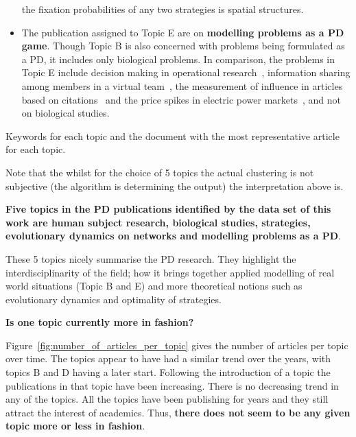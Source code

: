 \begin{itemize}
    the fixation probabilities of any two strategies is spatial
    structures.
    \item The publication assigned to Topic E are on \textbf{modelling problems
    as a PD game}. Though Topic B is also concerned with problems being formulated
    as a PD, it includes only biological problems. In comparison, the problems
    in Topic E include decision making in
    operational research~\cite{ormerod2010or}, information sharing among members
    in a virtual team~\cite{feng2008trilateral}, the measurement of influence
    in articles based on citations~\cite{hutchins2016relative} and the price
    spikes in electric power markets~\cite{Guan2002}, and not on biological studies.
\end{itemize}

\begin{table}[!hbtp]
    \begin{center}
    \resizebox{\textwidth}{!}{
    }
    \end{center}
    \caption{Keywords for each topic and the document with the most representative article for each topic.}
    \label{table:topics_and_articles}
\end{table}

Note that the whilst for the choice of 5 topics the actual clustering is not
subjective (the algorithm is determining the output) the interpretation above is.

\textbf{Five topics in the PD publications identified by the data set of this
work are human subject research, biological studies, strategies, evolutionary
dynamics on networks and modelling problems as a PD}.

These 5 topics nicely
summarise the PD research. They highlight the interdisciplinarity of the field;
how it brings together applied modelling of real world situations (Topic B and E)
and more theoretical notions such as evolutionary dynamics and optimality of
strategies.

\textbf{Is one topic currently more in fashion?}

Figure~\ref{fig:number_of_articles_per_topic} gives the number of articles
per topic over time. The topics appear to have had a similar trend over the years,
with topics B and D having a later start. Following the introduction of a topic
the publications in that topic have been increasing. There is no decreasing
trend in any of the topics. All the topics have been publishing for years and
they still attract the interest of academics. Thus, \textbf{there does not
seem to be any given topic more or less in fashion}.

